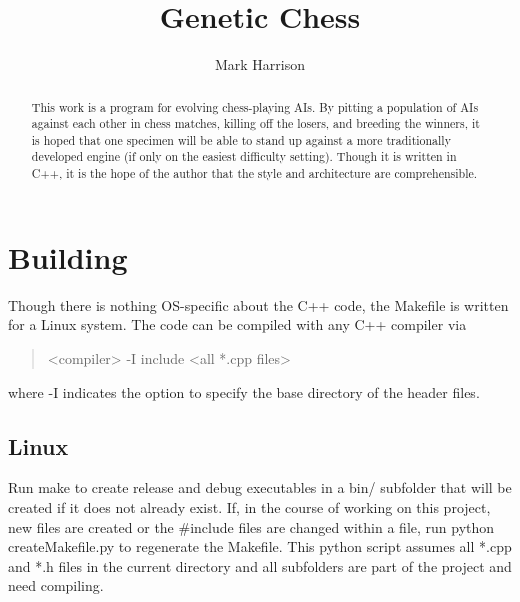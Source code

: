 \documentclass[letterpaper]{article}
\title{Genetic Chess}
\author{Mark Harrison}
\newcommand{\cpp}{C{\nobreak +}{\nobreak +}}
\newcommand{\code}[1]{#1}
\renewcommand\_{\textunderscore\allowbreak}
\begin{document}
\maketitle

\begin{abstract}
This work is a program for evolving chess-playing AIs.  By pitting a population of AIs against each other in chess matches, killing off the losers, and breeding the winners, it is hoped that one specimen will be able to stand up against a more traditionally developed engine (if only on the easiest difficulty setting). Though it is written in \cpp{}, it is the hope of the author that the style and architecture are comprehensible.
\end{abstract}

\tableofcontents{}


\section{Building}
Though there is nothing OS-specific about the \cpp{} code, the Makefile is written for a Linux system. The code can be compiled with any \cpp{} compiler via
\begin{quote}
	\code{<compiler> -I include <all *.cpp files>}
\end{quote}
where \code{-I} indicates the option to specify the base directory of the header files.

\subsection{Linux}
Run \code{make} to create release and debug executables in a \code{bin/} subfolder that will be created if it does not already exist. If, in the course of working on this project, new files are created or the \code{\#include} files are changed within a file, run \code{python create\_Makefile.py} to regenerate the Makefile. This python script assumes all \code{*.cpp} and \code{*.h} files in the current directory and all subfolders are part of the project and need compiling.
\end{document}
